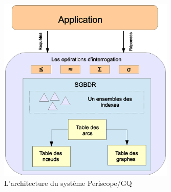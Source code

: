 \begin{figure}[h]
    \centering
    \includegraphics[width=0.75\textwidth]{figs/periscope-gq.eps}
    \caption{L'architecture du système Periscope/GQ \cite{tian2008periscope}}
    \label{fig:periscope-gq}
\end{figure}

